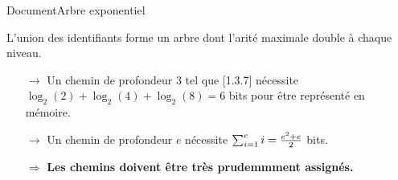 \begin{frame}{Document}{Arbre exponentiel}

  \begin{center}
    
  \end{center}

  L'union des identifiants forme un arbre dont l'arité maximale double à chaque
  niveau.
  
  \begin{itemize}
  \item [$\rightarrow$] Un chemin de profondeur 3 tel que [1.3.7] nécessite
    $\log_2(2)+\log_2(4)+\log_2(8)=6$ bits pour être représenté en mémoire.
  \item [$\rightarrow$] Un chemin de profondeur $e$ nécessite
    $\sum_{i=1}^e i = {e^2 + e \over 2}$ bits.
  \end{itemize}

  \vspace{0.25cm}
  \large
  \begin{itemize}
  \item [$\Rightarrow$] \textbf{Les chemins doivent être très prudemmment assignés.}
  \end{itemize}
    

\end{frame}


